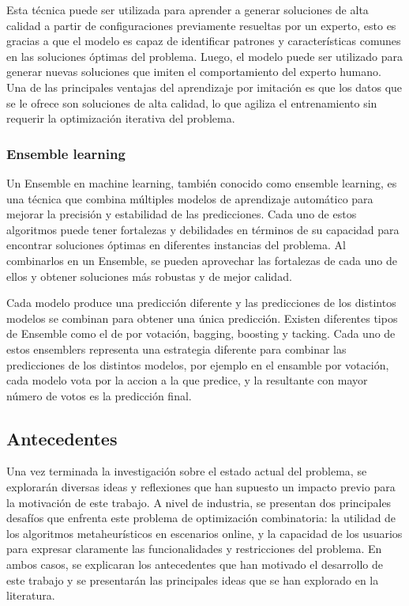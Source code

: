 Esta técnica puede ser utilizada para aprender a generar soluciones de alta calidad a partir de 
configuraciones previamente resueltas por un experto, esto es gracias a que el modelo es capaz de 
identificar patrones y características comunes en las soluciones óptimas del problema. Luego, el 
modelo puede ser utilizado para generar nuevas soluciones que imiten el comportamiento del experto 
humano. Una de las principales ventajas del aprendizaje por imitación es que los datos que se le 
ofrece son soluciones de alta calidad, lo que agiliza el entrenamiento sin requerir la optimización 
iterativa del problema. 

\subsubsection{Ensemble learning}
Un Ensemble en machine learning, también conocido como ensemble learning, es una técnica que 
combina múltiples modelos de aprendizaje automático para mejorar la precisión y estabilidad de 
las predicciones. Cada uno de estos algoritmos puede tener fortalezas y debilidades en términos 
de su capacidad para encontrar soluciones óptimas en diferentes instancias del problema. Al 
combinarlos en un Ensemble, se pueden aprovechar las fortalezas de cada uno de ellos y obtener
soluciones más robustas y de mejor calidad.\medskip

Cada modelo produce una predicción diferente y las predicciones de los distintos modelos se combinan 
para obtener una única predicción. Existen diferentes tipos de Ensemble como el de por votación, bagging, 
boosting y tacking. Cada uno de estos ensemblers representa una estrategia diferente para combinar las 
predicciones de los distintos modelos, por ejemplo en el ensamble por votación, cada modelo vota por 
la accion a la que predice, y la resultante con mayor número de votos es la predicción final.

\subsection{Antecedentes}
Una vez terminada la investigación sobre el estado actual del problema, se explorarán diversas ideas 
y reflexiones que han supuesto un impacto previo para la motivación de este trabajo. A nivel de industria, se 
presentan dos principales desafíos que enfrenta este problema de optimización combinatoria: la utilidad de los 
algoritmos metaheurísticos en escenarios online, y la capacidad de los usuarios para expresar claramente las 
funcionalidades y restricciones del problema. En ambos casos, se explicaran los antecedentes que han motivado
el desarrollo de este trabajo y se presentarán las principales ideas que se han explorado en la literatura.\medskip

